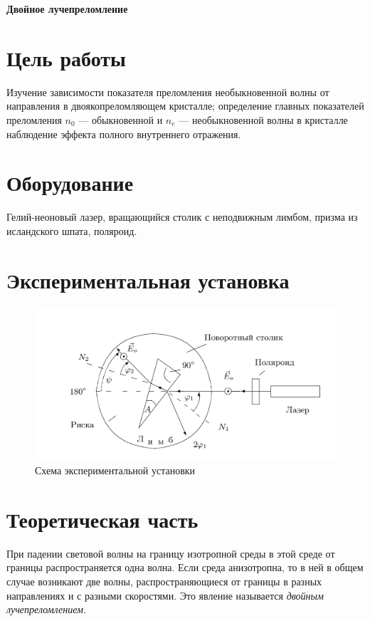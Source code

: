\documentclass[10pt, a4paper]{article}
\begin{document}
\huge
\begin{center}
\textbf{Двойное лучепреломление}
\end{center}
\parindent=1cm
\large
	\section*{Цель работы}
	
 Изучение зависимости показателя преломления необыкновенной волны от направления в двоякопреломляющем кристалле; определение главных показателей преломления $n_0$ --- обыкновенной и $n_e$ --- необыкновенной волны в кристалле наблюдение эффекта полного внутреннего отражения.
	\section*{Оборудование}

	Гелий-неоновый лазер, вращающийся столик с неподвижным лимбом, призма из исландского шпата, поляроид.
	\section*{Экспериментальная установка}
\begin{figure}[H]
	\includegraphics[width = 1.0\linewidth]{ust.png}
	\caption*{Схема экспериментальной установки}
\end{figure}	
\section*{Теоретическая часть}

При падении световой волны на границу изотропной среды в этой среде от границы распространяется одна волна. Если среда анизотропна, то в ней в общем случае возникают две волны, распространяющиеся от границы в разных направлениях и с разными скоростями. Это явление называется \textit{двойным лучепреломлением}.
\end{document}
